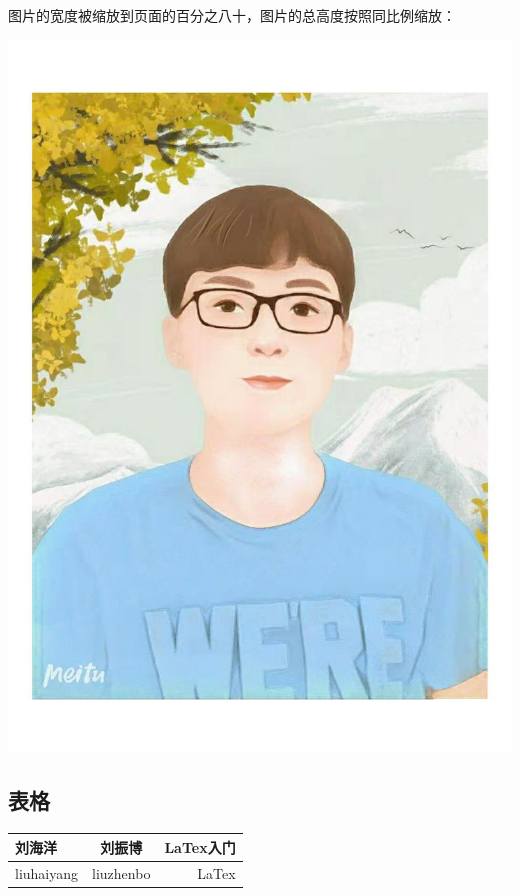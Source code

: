 \documentclass[UTF8]{ctexart}
\begin{document}
图片的宽度被缩放到页面的百分之八十，图片的总高度按照同比例缩放：

\includegraphics[width=.8\textwidth]{liu.jpg}

\subsection{表格}
\begin{tabular}{|l|c|r|}
\hline
刘海洋&刘振博&LaTex入门\\
\hline
liuhaiyang & liuzhenbo & LaTex\\
\hline
\end{tabular}
\end{document}
